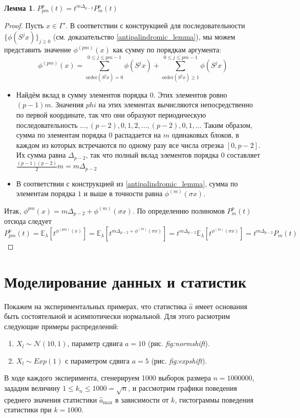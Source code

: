 \documentclass[14pt, a4paper, russian]{report}
\newtheorem{lemma}{\indent Лемма}
\begin{document}
\begin{lemma}\label{simple_case} $P_{pm}^p(t)=t^{m\Delta_{p-2}}P_m^p(t)$
\end{lemma}
\begin{proof}
Пусть $x \in \Gamma'$. В соответствии с конструкцией для последовательности $\{\phi(S^j x)\}_{j \ge 0}$ (см. доказательство \cref{antipalindromic_lemma}), мы можем представить значение $\phi^{(pm)}(x)$ как сумму по порядкам аргумента: 
$$ \phi^{(pm)}(x) = \sum\limits_{\mathrm{order}(S^j x) = 0}^{0 \le j \le pm-1}\phi(S^j x) + \sum\limits_{\mathrm{order}(S^j x) \ge 1}^{0 \le j \le pm-1} \phi(S^j x)$$
\begin{itemize}
\item Найдём вклад в сумму элементов порядка $0$. Этих элементов ровно $(p-1)m$. Значения $phi$ на этих элементах вычисляются непосредственно по первой координате, так что они образуют периодическую последовательность $\ldots,(p-2),0,1,2,...,(p-2),0,1,\ldots$ Таким образом, сумма по элементам порядка $0$ распадается на $m$ одинаковых блоков, в каждом из которых встречаются по одному разу все числа отрезка $\left[ 0, p-2 \right]$. Их сумма равна $\Delta_{p-2}$, так что полный вклад элементов порядка $0$ составляет $\frac{(p-1)(p-2)}{2}m=m\Delta_{p-2}$
\item В соответствии с конструкцией из \cref{antipalindromic_lemma}, сумма по элементам порядка $1$ и выше в точности равна $\phi^{(m)}(\sigma x)$.
\end{itemize}
Итак, $\phi^{pm}(x) = m\Delta_{p-2} + \phi^{(m)}(\sigma x)$. По определению полиномов $P_m^p(t)$ отсюда следует 
$$P_{pm}^p(t) = \mathbb{E}_\lambda\left[ t^{\phi^{(pm)}(x)}\right] = 
\mathbb{E}_\lambda\left[ t^{m\Delta_{p-2} + \phi^{(m)}(\sigma x)}\right] = 
t^{m\Delta_{p-2}} \mathbb{E}_\lambda \left[ t^{\phi^{(m)} (\sigma x)}  \right] = 
t^{m\Delta_{p-2} }P_m(t)$$
\end{proof}



\chapter{Моделирование данных и статистик}

Покажем на экспериментальных примерах, что статистика $\hat{a}$ имеет основания быть состоятельной и асимпотически нормальной. Для этого расмотрим следующие примеры распределений:
\begin{enumerate}
  \item $X_l \sim \mathcal{N}(10, 1)$, параметр сдвига $a = 10$ (рис. \textit{fig:normshift}).
  \item $X_l \sim Exp(1)$ с параметром сдвига $a = 5$ (рис. \textit{fig:expshift}).
\end{enumerate}
В ходе каждого эксперимента, сгенерируем 1000 выборок размера $n = 1000000$, зададим величину $1 \le k_n \le 1000 = \sqrt{n}$, и рассмотрим графики поведения среднего значения статистики $\hat{a}_{\max}$ в зависимости от $k$, гистограммы поведения статистики при $k = 1000$.
\end{document}
